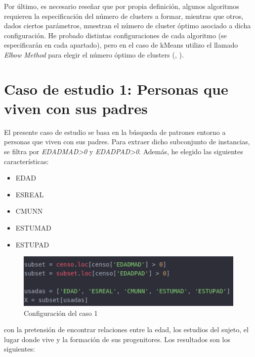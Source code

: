 Por último, es necesario reseñar que por propia definición, algunos algoritmos requieren la especificación del número de clusters a formar, mientras que otros, dados ciertos parámetros, muestran el número de cluster óptimo asociado a dicha configuración. He probado distintas configuraciones de cada algoritmo (se especificarán en cada apartado), pero en el caso de kMeans utilizo el llamado \textit{Elbow Method} para elegir el número óptimo de clusters (\cite{elbow-method}, \cite{elbow-method1}).

\newpage


\section{Caso de estudio 1: Personas que viven con sus padres}

El presente caso de estudio se basa en la búsqueda de patrones entorno a personas que viven con sus padres. Para extraer dicho subconjunto de instancias, se filtra por \textit{EDADMAD>0} y \textit{EDADPAD>0}. Además, he elegido las siguientes características:
\begin{itemize}
	\item EDAD
	\item ESREAL
	\item CMUNN
	\item ESTUMAD
	\item ESTUPAD
\end{itemize}

\begin{figure}[H] %
	\centering
	\includegraphics[scale=0.5]{c1-1.png}  %
	\caption{Configuración del caso 1} 
	\label{fig:configuración-caso1}
\end{figure}

con la pretensión de encontrar relaciones entre la edad, los estudios del sujeto, el lugar donde vive y la formación de sus progenitores. Los resultados son los siguientes:

